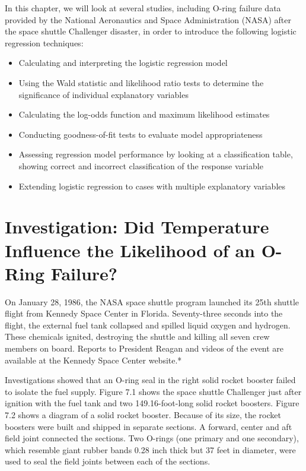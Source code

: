 \documentclass[
]{report}
\providecommand{\tightlist}{%
  \setlength{\itemsep}{0pt}\setlength{\parskip}{0pt}}
\begin{document}
In this chapter, we will look at several studies, including O-ring failure data provided by the National Aeronautics and Space Administration (NASA) after the space shuttle Challenger disaster, in order to introduce the following logistic regression techniques:

\begin{itemize}
\tightlist
\item
  Calculating and interpreting the logistic regression model\\
\item
  Using the Wald statistic and likelihood ratio tests to determine the significance of individual explanatory variables\\
\item
  Calculating the log-odds function and maximum likelihood estimates\\
\item
  Conducting goodness-of-fit tests to evaluate model appropriateness\\
\item
  Assessing regression model performance by looking at a classification table, showing correct and incorrect classification of the response variable\\
\item
  Extending logistic regression to cases with multiple explanatory variables
\end{itemize}

\section{\texorpdfstring{\textbf{Investigation: Did Temperature Influence the Likelihood of an O-Ring Failure?}}{Investigation: Did Temperature Influence the Likelihood of an O-Ring Failure?}}\label{investigation-did-temperature-influence-the-likelihood-of-an-o-ring-failure}

On January 28, 1986, the NASA space shuttle program launched its 25th shuttle flight from Kennedy Space Center in Florida. Seventy-three seconds into the flight, the external fuel tank collapsed and spilled liquid oxygen and hydrogen. These chemicals ignited, destroying the shuttle and killing all seven crew members on board. Reports to President Reagan and videos of the event are available at the Kennedy Space Center website.*

Investigations showed that an O-ring seal in the right solid rocket booster failed to isolate the fuel supply. Figure 7.1 shows the space shuttle Challenger just after ignition with the fuel tank and two 149.16-foot-long solid rocket boosters. Figure 7.2 shows a diagram of a solid rocket booster. Because of its size, the rocket boosters were built and shipped in separate sections. A forward, center and aft field joint connected the sections. Two O-rings (one primary and one secondary), which resemble giant rubber bands 0.28 inch thick but 37 feet in diameter, were used to seal the field joints between each of the sections.
\end{document}

